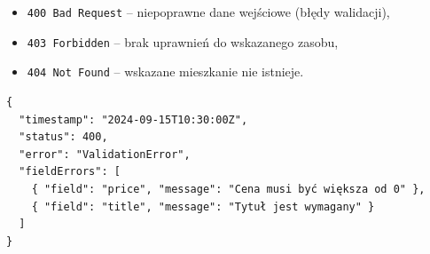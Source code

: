 \documentclass[11pt, a4paper]{article}
\begin{document}
\begin{itemize}
    \item \texttt{400 Bad Request} – niepoprawne dane wejściowe (błędy walidacji),
    \item \texttt{403 Forbidden} – brak uprawnień do wskazanego zasobu,
    \item \texttt{404 Not Found} – wskazane mieszkanie nie istnieje.
\end{itemize}

\begin{lstlisting}[style=json,caption={Przykładowa odpowiedź — błąd walidacji}]
{
  "timestamp": "2024-09-15T10:30:00Z",
  "status": 400,
  "error": "ValidationError",
  "fieldErrors": [
    { "field": "price", "message": "Cena musi być większa od 0" },
    { "field": "title", "message": "Tytuł jest wymagany" }
  ]
}
\end{lstlisting}

\end{document}
